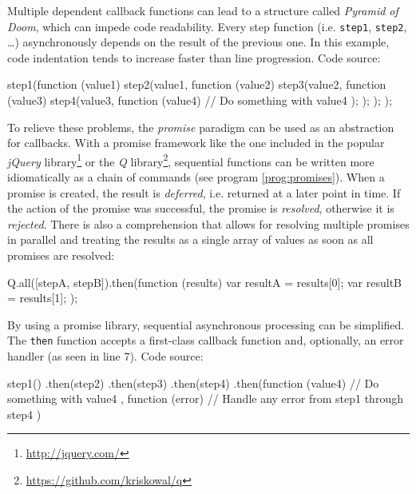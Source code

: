 \begin{program}
  \caption{Multiple dependent callback functions can lead to a structure called \textit{Pyramid of Doom}, which can impede code readability. Every step function (i.e. \texttt{step1}, \texttt{step2}, \ldots) asynchronously depends on the result of the previous one. In this example, code indentation tends to increase faster than line progression. Code source: \cite[p. 21]{Torstensson2012}}
  \label{prog:doom}
  \begin{JavaCode}
step1(function (value1) {
    step2(value1, function (value2) {
        step3(value2, function (value3) {
            step4(value3, function (value4) {
                // Do something with value4
            });
        });
    });
});	
  \end{JavaCode}
\end{program}

To relieve these problems, the \textit{promise} paradigm can be used as an abstraction for callbacks. With a promise framework like the one included in the popular \textit{jQuery} library\footnote{\url{http://jquery.com/}} or the \textit{Q} library\footnote{\url{https://github.com/kriskowal/q}}, sequential functions can be written more idiomatically as a chain of commands (see program \ref{prog:promises}). When a promise is created, the result is \textit{deferred}, i.e. returned at a later point in time. If the action of the promise was successful, the promise is \textit{resolved}, otherwise it is \textit{rejected}. There is also a comprehension that allows for resolving multiple promises in parallel and treating the results as a single array of values as soon as all promises are resolved:

\begin{JavaCode}
Q.all([stepA, stepB]).then(function (results) {
    var resultA = results[0];
    var resultB = results[1];
});
\end{JavaCode}

\begin{program}
  \caption{By using a promise library, sequential asynchronous processing can be simplified. The \texttt{then} function accepts a first-class callback function and, optionally, an error handler (as seen in line 7). Code source: \cite[p. 21]{Torstensson2012}}
  \label{prog:promises}
  \begin{JavaCode}
step1()
.then(step2)
.then(step3)
.then(step4)
.then(function (value4) {
    // Do something with value4
}, function (error) {
    // Handle any error from step1 through step4
})
  \end{JavaCode}
\end{program}

